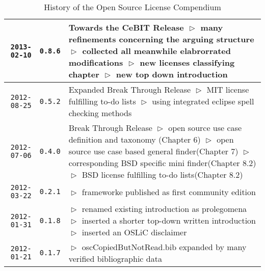 \begin{table}
\footnotesize
\caption{History of the Open Source License Compendium}
\begin{center}
\begin{tabular}{|r|c|p{10cm}|}
\hline
\hline
    \texttt{2013-02-10}
  & \texttt{0.8.6} 
  & Towards the CeBIT Release\newline
    $\vartriangleright$ many refinements concerning the arguing structure\newline
    $\vartriangleright$ collected all meanwhile elabrorrated modifications\newline
    $\vartriangleright$ new licenses classifying chapter\newline   
    $\vartriangleright$ new top down introduction\newline
    \\
\hline
    \texttt{2012-08-25}
  & \texttt{0.5.2} 
  & Expanded Break Through Release\newline
    $\vartriangleright$ MIT license fulfilling to-do lists\newline
    $\vartriangleright$ using integrated eclipse spell checking methods\newline
    \\
\hline
    \texttt{2012-07-06}
  & \texttt{0.4.0} 
  & Break Through Release\newline
    $\vartriangleright$ open source use case definition and taxonomy
    (Chapter 6)\newline 
    $\vartriangleright$ open source use case based general finder(Chapter
    7)\newline 
    $\vartriangleright$ corresponding BSD specific mini finder(Chapter
    8.2)\newline 
    $\vartriangleright$ BSD license fulfilling to-do lists(Chapter 8.2)\\
\hline
    \texttt{2012-03-22}
  & \texttt{0.2.1} 
  & $\vartriangleright$ frameworke published as first community edition\\
\hline
    \texttt{2012-01-31}
  & \texttt{0.1.8} 
  & $\vartriangleright$ renamed existing introduction as prolegomena\newline
    $\vartriangleright$ inserted a shorter top-down written introduction\newline
    $\vartriangleright$ inserted an OSLiC disclaimer\\
\hline
    \texttt{2012-01-21}
  & \texttt{0.1.7} 
  & $\vartriangleright$ oscCopiedButNotRead.bib expanded by many verified
  bibliographic data \newline 

\end{tabular}
\end{center}
\end{table}

